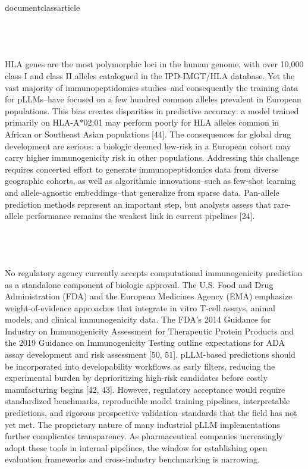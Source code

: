 \\documentclass{article}
\begin{document}
\subsection{}

HLA genes are the most polymorphic loci in the human genome, with over 10,000 class I and class II alleles catalogued in the IPD-IMGT/HLA database. Yet the vast majority of immunopeptidomics studies--and consequently the training data for pLLMs--have focused on a few hundred common alleles prevalent in European populations. This bias creates disparities in predictive accuracy: a model trained primarily on HLA-A*02:01 may perform poorly for HLA alleles common in African or Southeast Asian populations [44]. The consequences for global drug development are serious: a biologic deemed low-risk in a European cohort may carry higher immunogenicity risk in other populations. Addressing this challenge requires concerted effort to generate immunopeptidomics data from diverse geographic cohorts, as well as algorithmic innovations--such as few-shot learning and allele-agnostic embeddings--that generalize from sparse data. Pan-allele prediction methods represent an important step, but analysts assess that rare-allele performance remains the weakest link in current pipelines [24].

\subsection{}

No regulatory agency currently accepts computational immunogenicity prediction as a standalone component of biologic approval. The U.S. Food and Drug Administration (FDA) and the European Medicines Agency (EMA) emphasize weight-of-evidence approaches that integrate in vitro T-cell assays, animal models, and clinical immunogenicity data. The FDA's 2014 Guidance for Industry on Immunogenicity Assessment for Therapeutic Protein Products and the 2019 Guidance on Immunogenicity Testing outline expectations for ADA assay development and risk assessment [50, 51]. pLLM-based predictions should be incorporated into developability workflows as early filters, reducing the experimental burden by deprioritizing high-risk candidates before costly manufacturing begins [42, 43]. However, regulatory acceptance would require standardized benchmarks, reproducible model training pipelines, interpretable predictions, and rigorous prospective validation--standards that the field has not yet met. The proprietary nature of many industrial pLLM implementations further complicates transparency. As pharmaceutical companies increasingly adopt these tools in internal pipelines, the window for establishing open evaluation frameworks and cross-industry benchmarking is narrowing.
\end{document}
